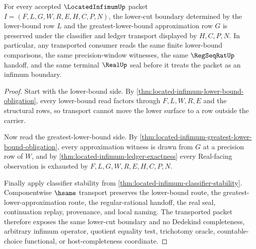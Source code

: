 \begin{theorem}
\label{thm:located-infimum-lower-cut-stability}
For every accepted $\LocatedInfimumUp$ packet $I=(F,L,G,W,R,E,H,C,P,N)$, the lower-cut boundary determined by the lower-bound row $L$ and the greatest-lower-bound approximation row $G$ is preserved under the classifier and ledger transport displayed by $H,C,P,N$. In particular, any transported consumer reads the same finite lower-bound comparisons, the same precision-window witnesses, the same $\RegSeqRatUp$ handoff, and the same terminal $\RealUp$ seal before it treats the packet as an infimum boundary.
\end{theorem}
\begin{proof}
Start with the lower-bound side. By \autoref{thm:located-infimum-lower-bound-obligation}, every lower-bound read factors through $F,L,W,R,E$ and the structural rows, so transport cannot move the lower surface to a row outside the carrier.

Now read the greatest-lower-bound side. By \autoref{thm:located-infimum-greatest-lower-bound-obligation}, every approximation witness is drawn from $G$ at a precision row of $W$, and by \autoref{thm:located-infimum-ledger-exactness} every Real-facing observation is exhausted by $F,L,G,W,R,E,H,C,P,N$.

Finally apply classifier stability from \autoref{thm:located-infimum-classifier-stability}. Componentwise $\hsame$ transport preserves the lower-bound route, the greatest-lower-approximation route, the regular-rational handoff, the real seal, continuation replay, provenance, and local naming. The transported packet therefore exposes the same lower-cut boundary and no Dedekind completeness, arbitrary infimum operator, quotient equality test, trichotomy oracle, countable-choice functional, or host-completeness coordinate.
\end{proof}

